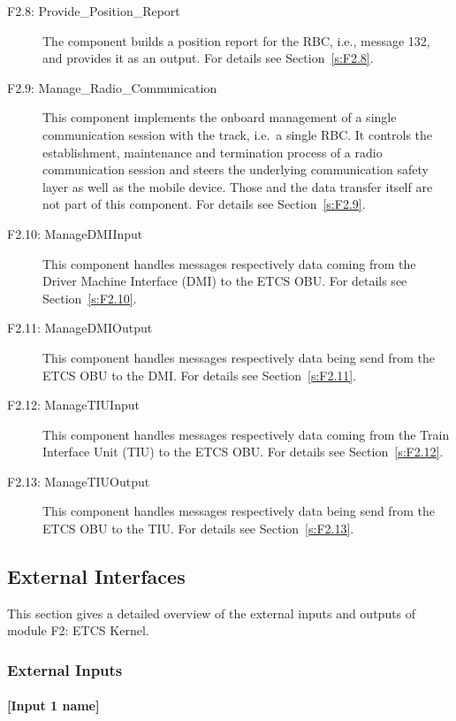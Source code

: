 \begin{description}
\item[F2.8: Provide\_Position\_Report] The component builds a position report for the RBC, i.e., message 132, and provides it as an output.  For details see Section~\ref{s:F2.8}.
\item[F2.9: Manage\_Radio\_Communication] This component implements the onboard management of a single communication session with the track, i.e.~a single RBC. It controls the establishment, maintenance and termination process of a radio communication session and steers the underlying communication safety layer as well as the mobile device. Those and the data transfer itself are not part of this component. For details see Section~\ref{s:F2.9}.
\item[F2.10: ManageDMIInput] This component handles messages respectively data coming from the Driver Machine Interface (DMI) to the ETCS OBU. For details see Section~\ref{s:F2.10}.
\item[F2.11: ManageDMIOutput] This component handles messages respectively data being send from the ETCS OBU to the DMI. For details see Section~\ref{s:F2.11}.
\item[F2.12: ManageTIUInput] This component handles messages respectively data coming from the Train Interface Unit (TIU) to the ETCS OBU. For details see Section~\ref{s:F2.12}.
\item[F2.13: ManageTIUOutput] This component handles messages respectively data being send from the ETCS OBU to the TIU. For details see Section~\ref{s:F2.13}.
\end{description}


\subsection{External Interfaces}
This section gives a detailed overview of the external inputs and outputs of module F2: ETCS Kernel.

\subsubsection{External Inputs}

\paragraph{[Input 1 name]}

